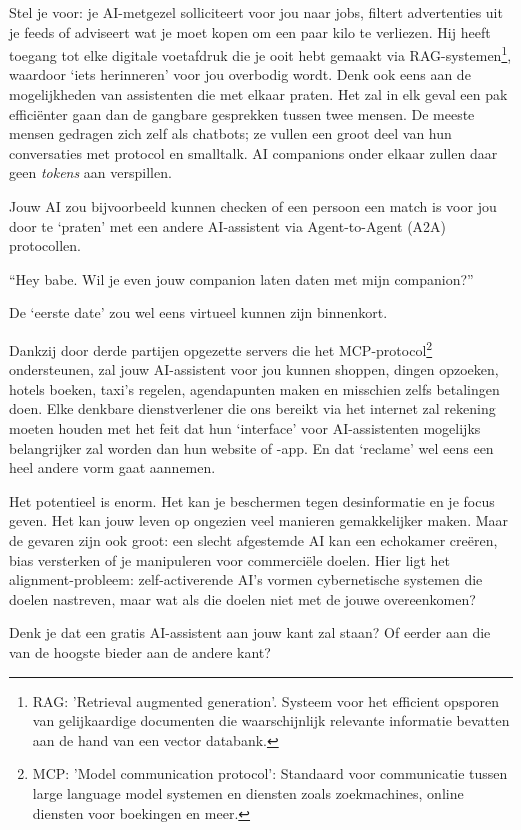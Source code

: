\documentclass[twocolumn]{article}
\begin{document}
Stel je voor: je AI-metgezel solliciteert voor jou naar jobs, filtert advertenties uit je feeds of adviseert wat je moet kopen om een paar kilo te verliezen.
Hij heeft toegang tot elke digitale voetafdruk die je ooit hebt gemaakt via RAG-systemen\footnote{RAG: 'Retrieval augmented generation'. Systeem voor het efficient opsporen van gelijkaardige documenten die waarschijnlijk relevante informatie bevatten aan de hand van een vector databank.}, waardoor `iets herinneren' voor jou overbodig wordt.
Denk ook eens aan de mogelijkheden van assistenten die met elkaar praten.
Het zal in elk geval een pak efficiënter gaan dan de gangbare gesprekken tussen twee mensen.
De meeste mensen gedragen zich zelf als chatbots; ze vullen een groot deel van hun conversaties met protocol en smalltalk.
AI companions onder elkaar zullen daar geen \textit{tokens} aan verspillen.

Jouw AI zou bijvoorbeeld kunnen checken of een persoon een match is voor jou door te `praten' met een andere AI-assistent via Agent-to-Agent (A2A) protocollen.

``Hey babe. Wil je even jouw companion laten daten met mijn companion?''

De `eerste date' zou wel eens virtueel kunnen zijn binnenkort.

Dankzij door derde partijen opgezette servers die het MCP-protocol\footnote{MCP: 'Model communication protocol': Standaard voor communicatie tussen large language model systemen en diensten zoals zoekmachines, online diensten voor boekingen en meer.} ondersteunen, zal jouw AI-assistent voor jou kunnen shoppen, dingen opzoeken, hotels boeken, taxi’s regelen, agendapunten maken en misschien zelfs betalingen doen.
Elke denkbare dienstverlener die ons bereikt via het internet zal rekening moeten houden met het feit dat hun `interface' voor AI-assistenten mogelijks belangrijker zal worden dan hun website of -app.
En dat `reclame' wel eens een heel andere vorm gaat aannemen.

Het potentieel is enorm.
Het kan je beschermen tegen desinformatie en je focus geven.
Het kan jouw leven op ongezien veel manieren gemakkelijker maken.
Maar de gevaren zijn ook groot: een slecht afgestemde AI kan een echokamer creëren, bias versterken of je manipuleren voor commerciële doelen.
Hier ligt het alignment-probleem: zelf-activerende AI's vormen cybernetische systemen die doelen nastreven, maar wat als die doelen niet met de jouwe overeenkomen?

Denk je dat een gratis AI-assistent aan jouw kant zal staan?
Of eerder aan die van de hoogste bieder aan de andere kant?
\end{document}
